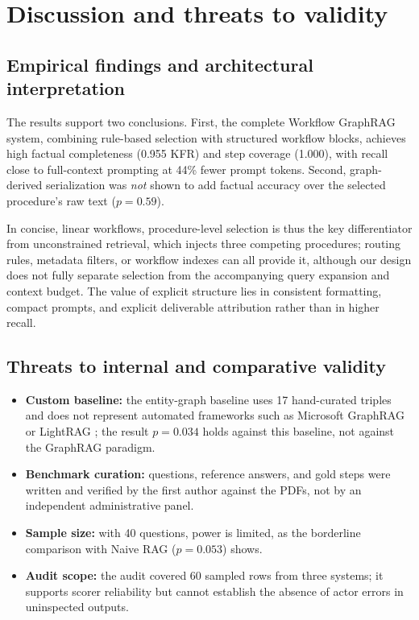 \documentclass[preprint,10pt]{elsarticle}
\begin{document}
\section{Discussion and threats to validity}
\label{sec:discussion}

\subsection{Empirical findings and architectural interpretation}
The results support two conclusions. First, the complete Workflow GraphRAG system, combining rule-based selection with structured workflow blocks, achieves high factual completeness (0.955 KFR) and step coverage (1.000), with recall close to full-context prompting at 44\% fewer prompt tokens. Second, graph-derived serialization was \emph{not} shown to add factual accuracy over the selected procedure's raw text ($p=0.59$).

In concise, linear workflows, procedure-level selection is thus the key differentiator from unconstrained retrieval, which injects three competing procedures; routing rules, metadata filters, or workflow indexes can all provide it, although our design does not fully separate selection from the accompanying query expansion and context budget. The value of explicit structure lies in consistent formatting, compact prompts, and explicit deliverable attribution rather than in higher recall.

\subsection{Threats to internal and comparative validity}
\begin{itemize}[leftmargin=*]
\item \textbf{Custom baseline:} the entity-graph baseline uses 17 hand-curated triples and does not represent automated frameworks such as Microsoft GraphRAG \cite{edge2024graphrag} or LightRAG \cite{guo2024lightrag}; the result $p=0.034$ holds against this baseline, not against the GraphRAG paradigm.
\item \textbf{Benchmark curation:} questions, reference answers, and gold steps were written and verified by the first author against the PDFs, not by an independent administrative panel.
\item \textbf{Sample size:} with 40 questions, power is limited, as the borderline comparison with Naive RAG ($p=0.053$) shows.
\item \textbf{Audit scope:} the audit covered 60 sampled rows from three systems; it supports scorer reliability but cannot establish the absence of actor errors in uninspected outputs.
\end{itemize}
\end{document}
